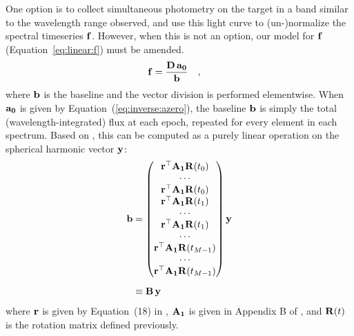 \documentclass[modern]{aastex631}
\begin{document}
One option is to collect simultaneous photometry on the target in a band similar to the wavelength range observed, and use this light curve to (un-)normalize the spectral timeseries ${\mathbf{f}}$. 
However, when this is not an option, our model for ${\mathbf{f}}$ (Equation~\ref{eq:linear:f}) must be amended.
%
\begin{align}
    \label{eq:norm:f}
    {\ensuremath{\mathbf{f}}}
     & =
    \frac{
        {\mathbf{D}}
        \,
        {\mathbf{a_0}}
    } {
        {\mathbf{b}}
    }
    \quad,
\end{align}
%
where ${\mathbf{b}}$ is the baseline and the vector division is performed elementwise. 
When ${\mathbf{a_0}}$ is given by Equation~(\ref{eq:inverse:azero}), the baseline ${\mathbf{b}}$ is simply the total (wavelength-integrated) flux at each epoch, repeated for every element in each spectrum.
Based on \citet{Luger2019}, this can be computed as a purely linear operation on the spherical harmonic vector ${\mathbf{y}}$:
%
\begin{align}
    \label{eq:norm:b}
    {\ensuremath{\mathbf{b}}}
     & =
    \begin{pmatrix}
        {\ensuremath{\mathbf{r}}}^\top {\ensuremath{\mathbf{A_1}}} {\ensuremath{\mathbf{R}}}(t_0)     \\
        \cdots                                     \\
        {\mathbf{r}}^\top {\ensuremath{\mathbf{A_1}}} {\ensuremath{\mathbf{R}}}(t_0)     \\
        {\mathbf{r}}^\top {\ensuremath{\mathbf{A_1}}} {\ensuremath{\mathbf{R}}}(t_1)     \\
        \cdots                                     \\
        {\mathbf{r}}^\top {\ensuremath{\mathbf{A_1}}} {\ensuremath{\mathbf{R}}}(t_1)     \\
        \cdots                                     \\
        {\mathbf{r}}^\top {\ensuremath{\mathbf{A_1}}} {\ensuremath{\mathbf{R}}}(t_{M-1}) \\
        \cdots                                     \\
        {\mathbf{r}}^\top {\ensuremath{\mathbf{A_1}}} {\ensuremath{\mathbf{R}}}(t_{M-1})
    \end{pmatrix}
    {\ensuremath{\mathbf{y}}}
    \nonumber \\[0.5em]
     & \equiv
    {\ensuremath{\mathbf{B}}} \, {\mathbf{y}}
\end{align}
%
where ${\mathbf{r}}$ is given by Equation~(18) in \citet{Luger2019}, ${\mathbf{A_1}}$ is given in Appendix B of \citet{Luger2019}, and ${\mathbf{R}}(t)$ is the rotation matrix defined previously.
\end{document}
